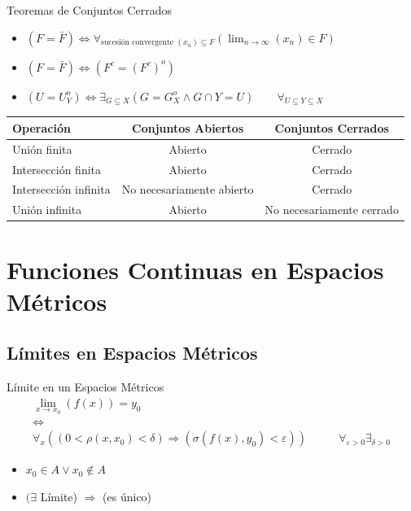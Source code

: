 \documentclass[a4paper,11pt]{article}
\begin{document}
\begin{definicion*}{Teoremas de Conjuntos Cerrados}{}
  \begin{itemize}
    \item $(F = \bar{F}) \Leftrightarrow \forall_{\text{sucesión convergente } (x_n) \subseteq F} \left( \lim_{n \to \infty} (x_n) \in F \right)$
    \item $(F = \bar{F}) \Leftrightarrow (F^c = (F^c)^o)$
    \item $(U = U_Y^o) \Leftrightarrow \exists_{G\subseteq X}(G = G_X^o \wedge G\cap Y = U) \qquad \forall_{U \subseteq Y \subseteq X} $
  \end{itemize}
  \begin{center}
  \begin{tabular}{l c c}
    \hline
    \textbf{Operación} & \textbf{Conjuntos Abiertos} & \textbf{Conjuntos Cerrados} \\
    \hline
    Unión finita & Abierto & Cerrado \\
    Intersección finita & Abierto & Cerrado \\
    Intersección infinita & No necesariamente abierto & Cerrado \\
    Unión infinita & Abierto & No necesariamente cerrado \\
    \hline
  \end{tabular}
  \end{center}
\end{definicion*}

\newpage

\section{Funciones Continuas en Espacios Métricos}

\subsection{Límites en Espacios Métricos}

\begin{definicion*}{Límite en un Espacios Métricos}{}
  \begin{equation*}
    \begin{array}{cc}
      \lim_{x \to x_0}(f(x)) = y_0 &\\
      \Leftrightarrow&\\
      \forall_x\left((0 < \rho(x, x_0) < \delta) \Rightarrow (\sigma(f(x),y_0) < \varepsilon) \right) &\qquad \forall_{\varepsilon > 0} \exists_{\delta > 0} 
    \end{array}
  \end{equation*}
  \begin{itemize}
    \item $x_0 \in A \vee x_0 \notin A$
    \item $(\exists$ Límite) $\Rightarrow$ (es único)
  \end{itemize}
\end{definicion*}
\end{document}
